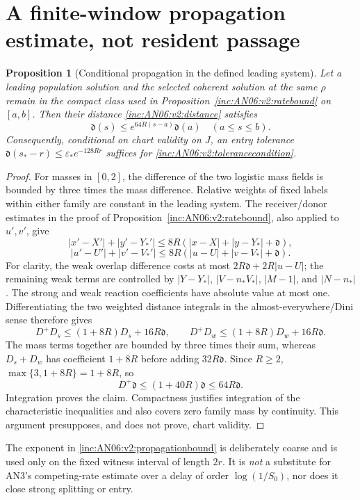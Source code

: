 \documentclass[11pt]{article}
\numberwithin{equation}{section}
\newtheorem{proposition}[theorem]{Proposition}
\theoremstyle{remark}\newtheorem{remark}[theorem]{Remark}
\newcommand{\1}{\mathbf 1}
\begin{document}
\section{A finite-window propagation estimate, not resident passage}
\label{inc:AN06:v2:finitewindow}
\begin{proposition}[Conditional propagation in the defined leading system]
\label{inc:AN06:v2:propagation}
Let a leading population solution and the selected coherent solution at
the same $\rho$ remain in the compact class used in
Proposition~\ref{inc:AN06:v2:ratebound} on $[a,b]$.
Then their distance \eqref{inc:AN06:v2:distance} satisfies
\begin{equation}\label{inc:AN06:v2:propagationbound}
 \mathfrak d(s)\le e^{64R(s-a)}\mathfrak d(a)
 \quad(a\le s\le b).
\end{equation}
Consequently, conditional on chart validity on $J$, an entry tolerance
$\mathfrak d(s_*-r)\le\varepsilon_*e^{-128Rr}$ suffices for
\eqref{inc:AN06:v2:tolerancecondition}.
\end{proposition}
\begin{proof}
For masses in $[0,2]$, the difference of the two logistic mass fields is
bounded by three times the mass difference. Relative weights of fixed
labels within either family are constant in the leading system.
The receiver/donor estimates in the proof of
Proposition~\ref{inc:AN06:v2:ratebound}, also applied to $u',v'$, give
\[
 |x'-X'|+|y'-Y_*'|\le8R(|x-X|+|y-Y_*|+\mathfrak d),
\]
\[
 |u'-U'|+|v'-V_*'|\le8R(|u-U|+|v-V_*|+\mathfrak d).
\]
For clarity, the weak overlap difference costs at most
$2R\mathfrak d+2R|u-U|$; the remaining weak terms are controlled by
$|Y-Y_*|$, $|V-n_*V_*|$, $|M-1|$, and $|N-n_*|$.
The strong and weak reaction coefficients have absolute value at most
one. Differentiating the two weighted distance integrals in the
almost-everywhere/Dini sense therefore gives
\[
 D^+D_s\le(1+8R)D_s+16R\mathfrak d,\qquad
 D^+D_w\le(1+8R)D_w+16R\mathfrak d.
\]
The mass terms together are bounded by three times their sum, whereas
$D_s+D_w$ has coefficient $1+8R$ before adding $32R\mathfrak d$.
Since $R\ge2$, $\max\{3,1+8R\}=1+8R$, so
\[
 D^+\mathfrak d\le(1+40R)\mathfrak d\le64R\mathfrak d.
\]
Integration proves the claim. Compactness justifies integration of the
characteristic inequalities and also covers zero family mass by
continuity. This argument presupposes, and does not prove, chart validity.
\end{proof}

The exponent in \eqref{inc:AN06:v2:propagationbound} is deliberately
coarse and is used only on the fixed witness interval of length $2r$.
It is \emph{not} a substitute for AN3's competing-rate estimate over a
delay of order $\log(1/S_0)$, nor does it close strong splitting or entry.
\end{document}
